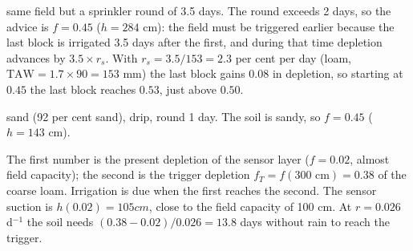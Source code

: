  same field but a sprinkler round of 3.5 days. The round exceeds 2 days, so the advice is $f=0.45$ ($h=284$ cm): the field must be triggered earlier because the last block is irrigated 3.5 days after the first, and during that time depletion advances by $3.5\times r_s$. With $r_s=3.5/153=2.3$ per cent per day (loam, $\mathrm{TAW}=1.7\times90=153$ mm) the last block gains $0.08$ in depletion, so starting at $0.45$ the last block reaches $0.53$, just above $0.50$.

 sand (92 per cent sand), drip, round 1 day. The soil is sandy, so $f=0.45$ ($h=143$ cm).


\sol {}\ans The first number is the present depletion of the sensor layer ($f=0.02$, almost field capacity); the second is the trigger depletion $f_T=f(300\text{ cm})=0.38$ of the coarse loam. Irrigation is due when the first reaches the second. The sensor suction is $h(0.02)=105 cm$, close to the field capacity of 100 cm. At $r=0.026$ d$^{-1}$ the soil needs $(0.38-0.02)/0.026=13.8$ days without rain to reach the trigger.
